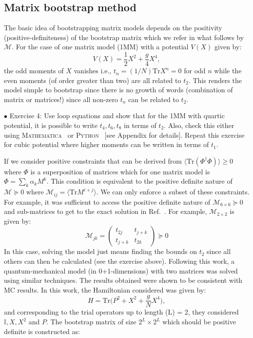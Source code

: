 \documentclass[11pt]{article}
\newcommand{\MA}{\textsc{Mathematica}}
\newcommand{\PY}{\textsc{Python}}
\begin{document}
\subsection{Matrix bootstrap method}
The basic idea of bootstrapping matrix models depends on the 
positivity (positive-definiteness) of the bootstrap matrix which we refer in what follows 
by $\mathcal{M}$. For the case of one matrix model (1MM) with a potential $V(X)$ given by: 
\begin{equation}
    V(X) = \frac12 X^2 + \frac{g}{4} X^4, 
\end{equation}
the odd moments of $X$ vanishes i.e., $ t_{n} = (1/N)\mbox{Tr} X^n = 0$ for odd $n$
while the even moments (of order greater than two) are all related to $t_{2}$. This renders the 
model simple to bootstrap since there is no growth of words (combination of matrix or matrices!)
since all non-zero $t_{n}$ can be related to $t_{2}$. 
\begin{mdframed}[backgroundcolor=blue!3] 
	\textsc{} 
	$\bullet$ Exercise 4: Use loop equations and show that for the 1MM with quartic potential, it is possible to write $t_{4}, t_{6}, t_{8}$ in terms of $t_{2}$. Also, check this either using \MA~ or \PY~ [see Appendix for details]. 
Repeat this exercise for cubic potential where higher moments can be written in terms of $t_1$.  
\end{mdframed} 
If we consider positive constraints that can be derived from $\langle \mbox{Tr}(\Phi^{\dagger}\Phi) \rangle \ge 0 $
where $\Phi$ is a superposition of matrices which for one matrix model is 
$ \Phi = \sum_{k} \alpha_{k} M^{k}$. This condition is equivalent to the positive definite nature of
$\mathcal{M} \succeq 0 $ where $ \mathcal{M}_{ij} = \langle \mbox{Tr} M^{i+j} \rangle$. 
We can only enforce a subset of these constraints. For example, it was sufficient to 
access the positive definite nature of $\mathcal{M}_{6 \times 6} \succeq 0 $ 
and sub-matrices to get to the exact solution in Ref.~\cite{Lin:2020mme}. 
For example, $\mathcal{M}_{2 \times 2}$ is given by:
\begin{equation}
	\mathcal{M}_{jk} = 
	\begin{pmatrix}
		t_{2j} & t_{j+k}  \\
		t_{j+k} & t_{2k}  
	\end{pmatrix}  \succeq 0
\end{equation}
In this case, solving the model just means finding the bounds on $t_{2}$ 
since all others can then be calculated (see the exercise above). 
Following this work, a quantum-mechanical 
model (in 0+1-dimensions) with two matrices was solved using similar techniques. 
The results obtained were shown to be consistent with MC results. 
In this work, the Hamiltonian considered was given by:
\begin{equation}
H = \mbox{Tr} \Big( P^2 + X^2 + \frac{g}{N} X^4 \Big),
\end{equation}
and corresponding to the trial operators up to length (L) = 2, 
they considered $ \mathbb{I}, X, X^{2}$ and $P$. The bootstrap matrix
of size $2^L \times 2^L$ which should be positive definite is constructed as:
\end{document}
